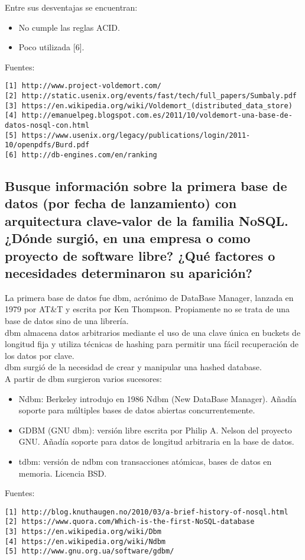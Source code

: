 \documentclass[12pt,a4paper,twoside,openright,titlepage,final]{article}
\begin{document}
Entre sus desventajas se encuentran:

\begin{itemize}
	\item No cumple las reglas ACID.
	\item Poco utilizada [6].
\end{itemize}


Fuentes:\\
\begin{verbatim}
[1] http://www.project-voldemort.com/
[2] http://static.usenix.org/events/fast/tech/full_papers/Sumbaly.pdf
[3] https://en.wikipedia.org/wiki/Voldemort_(distributed_data_store)
[4] http://emanuelpeg.blogspot.com.es/2011/10/voldemort-una-base-de-datos-nosql-con.html
[5] https://www.usenix.org/legacy/publications/login/2011-10/openpdfs/Burd.pdf
[6] http://db-engines.com/en/ranking
\end{verbatim}

\subsection{Busque información sobre la primera base de datos (por fecha de lanzamiento) con arquitectura clave-valor de la familia NoSQL. ¿Dónde surgió, en una empresa o como proyecto de software libre? ¿Qué factores o necesidades determinaron su aparición?}

La primera base de datos fue dbm, acrónimo de DataBase Manager, lanzada en 1979 por AT\&T y escrita por Ken Thompson. Propiamente no se trata de una base de datos sino de una librería.\\

dbm almacena datos arbitrarios mediante el uso de una clave única en buckets de longitud fija y utiliza técnicas de hashing para permitir una fácil recuperación de los datos por clave.\\

dbm surgió de la necesidad de crear y manipular una hashed database.\\

A partir de dbm surgieron varios sucesores:

\begin{itemize}
	\item Ndbm: Berkeley introdujo en 1986 Ndbm (New DataBase Manager). Añadía soporte para múltiples bases de datos abiertas concurrentemente.
	\item GDBM (GNU dbm): versión libre escrita por Philip A. Nelson del proyecto GNU. Añadía soporte para datos de longitud arbitraria en la base de datos.
	\item tdbm: versión de ndbm con transacciones atómicas, bases de datos en memoria. Licencia BSD.  
\end{itemize}

Fuentes:\\
\begin{verbatim}
[1] http://blog.knuthaugen.no/2010/03/a-brief-history-of-nosql.html
[2] https://www.quora.com/Which-is-the-first-NoSQL-database
[3] https://en.wikipedia.org/wiki/Dbm
[4] https://en.wikipedia.org/wiki/Ndbm
[5] http://www.gnu.org.ua/software/gdbm/
\end{verbatim}
\end{document}
